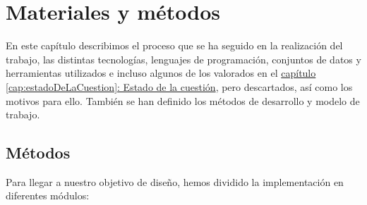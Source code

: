 \chapter{Materiales y métodos}
\label{cap:Materiales y metodos}



En este capítulo describimos el proceso que se ha seguido en la realización del trabajo, las distintas tecnologías, lenguajes de programación, conjuntos de datos y herramientas utilizados e incluso algunos de los valorados en el \hyperref[cap:estadoDeLaCuestion]{capítulo \ref*{cap:estadoDeLaCuestion}: Estado de la cuestión}, pero descartados, así como los motivos para ello. También se han definido los métodos de desarrollo y modelo de trabajo. \\


\section{Métodos}

Para llegar a nuestro objetivo de diseño, hemos dividido la implementación en diferentes módulos:

